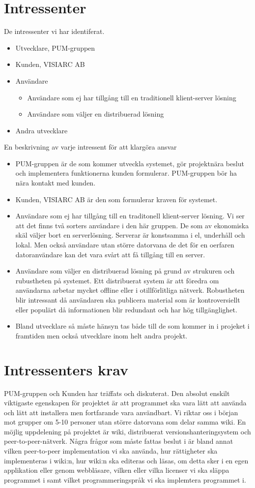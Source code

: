 \section{Intressenter}
De intressenter vi har identiferat.
\begin{itemize}
\item Utvecklare, PUM-gruppen
\item Kunden, VISIARC AB
\item Användare
\begin{itemize}
\item Användare som ej har tillgång till en traditionell klient-server lösning
\item Användare som väljer en distribuerad lösning
\end{itemize}
\item Andra utvecklare
\end{itemize}
En beskrivning av varje intressent för att klargöra ansvar  
\begin{itemize}
\item PUM-gruppen är de som kommer utveckla systemet, gör projektnära beslut och implementera funktionerna kunden formulerar.  PUM-gruppen bör ha nära kontakt med kunden.
\item Kunden, VISIARC AB är den som formulerar kraven för systemet. 
\item Användare som ej har tillgång till en traditonell klient-server lösning. Vi ser att det finns två sorters användare i den här gruppen. De som av ekonomiska skäl väljer bort en serverlösning. Serverar är konstsamma i el, underhåll och lokal. Men också användare utan större datorvana de det för en oerfaren datoranvändare kan det vara svårt att få tillgång till en server. 
\item Användare som väljer en distribuerad lösning på grund av strukuren och rubustheten på systemet. Ett distribuerat system är att föredra om användarna arbetar mycket offline eller i otillförlitliga nätverk. Robustheten blir intressant då användaren ska publicera material som är kontroversiellt eller populärt då informationen blir redundant och har hög tillgänglighet.
\item Bland utvecklare så måste hänsyn tas både till de som kommer in i projeket i framtiden men också utvecklare inom helt andra projekt.
\end{itemize}
\section{Intressenters krav}
PUM-gruppen och Kunden har träffats och diskuterat. Den absolut enskilt viktigaste egenskapen för projektet är att programmet ska vara lätt att använda och lätt att installera men fortfarande vara användbart.  Vi riktar oss i början mot grupper om 5-10 personer utan större datorvana som delar samma wiki. En möjlig uppdelening på projektet är wiki, distribuerat versionshanteringsystem och peer-to-peer-nätverk. Några frågor som måste fattas beslut i är bland annat vilken peer-to-peer implementation vi ska använda, hur rättigheter ska implementeras i wiki:n, hur wiki:n ska editeras och läsas, om detta sker i en egen applikation eller genom webbläsare, vilken eller vilka licenser vi ska släppa programmet i samt vilket programmeringspråk vi ska implemtera programmet i.
